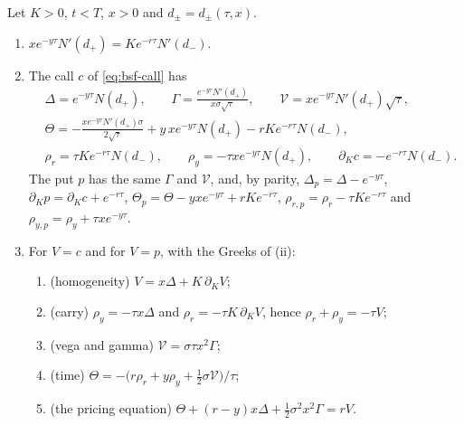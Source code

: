 \begin{proposition}\label{prop:bsf-greeks}
Let $K>0$, $t<T$, $x>0$ and $d_\pm=d_\pm(\tau,x)$.
\begin{enumerate}[label=(\roman*)]
  \item $xe^{-y\tau}N'(d_+)=Ke^{-r\tau}N'(d_-)$.
  \item The call $c$ of \eqref{eq:bsf-call} has
    \[
    \begin{aligned}
      &\Delta=e^{-y\tau}N(d_+),\qquad \Gamma=\frac{e^{-y\tau}N'(d_+)}{x\sigma\sqrt\tau},\qquad
      \mathcal V=xe^{-y\tau}N'(d_+)\sqrt\tau,\\
      &\Theta=-\frac{xe^{-y\tau}N'(d_+)\sigma}{2\sqrt\tau}+y\,xe^{-y\tau}N(d_+)-rKe^{-r\tau}N(d_-),\\
      &\rho_r=\tau Ke^{-r\tau}N(d_-),\qquad \rho_y=-\tau xe^{-y\tau}N(d_+),\qquad \partial_Kc=-e^{-r\tau}N(d_-).
    \end{aligned}
    \]
    The put $p$ has the same $\Gamma$ and $\mathcal V$, and, by parity, $\Delta_p=\Delta-e^{-y\tau}$,
    $\partial_Kp=\partial_Kc+e^{-r\tau}$, $\Theta_p=\Theta-yxe^{-y\tau}+rKe^{-r\tau}$,
    $\rho_{r,p}=\rho_r-\tau Ke^{-r\tau}$ and $\rho_{y,p}=\rho_y+\tau xe^{-y\tau}$.
  \item For $V=c$ and for $V=p$, with the Greeks of (ii):
    \begin{enumerate}[label=(\alph*)]
      \item (homogeneity) $V=x\Delta+K\,\partial_KV$;
      \item (carry) $\rho_y=-\tau x\Delta$ and $\rho_r=-\tau K\,\partial_KV$, hence $\rho_r+\rho_y=-\tau V$;
      \item (vega and gamma) $\mathcal V=\sigma\tau x^2\Gamma$;
      \item (time) $\Theta=-\big(r\rho_r+y\rho_y+\frac12\sigma\mathcal V\big)/\tau$;
      \item (the pricing equation) $\Theta+(r-y)x\Delta+\frac12\sigma^2x^2\Gamma=rV$.
    \end{enumerate}
\end{enumerate}
\end{proposition}

